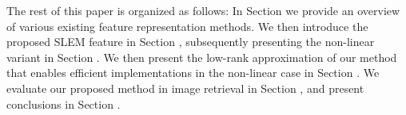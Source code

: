 The rest of this paper is organized as follows: In Section \label{prior work} we provide an overview of various existing feature representation methods. We then introduce the proposed SLEM feature in Section \label{lsesvm}, subsequently presenting the non-linear variant in Section \label{nonlinear SLEM}. We then present the low-rank approximation of our method that enables efficient implementations in the non-linear case in  Section \label{eff_imp}. We evaluate our proposed method in image retrieval in Section \label{sec_eval}, and present conclusions in Section \label{conclusion}.










